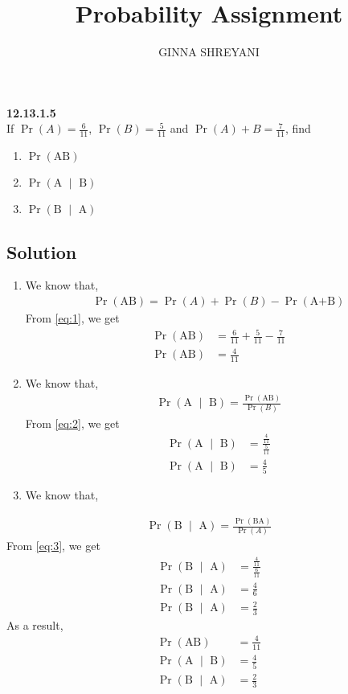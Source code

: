 \documentclass[10pt,twocolumn]{article}
\title{
Probability Assignment
}
\author{GINNA SHREYANI}
\date{}
\providecommand{\pr}[1]{\ensuremath{\Pr\left(#1\right)}}
\begin{document}
\maketitle


\textbf{12.13.1.5}\\
If $\pr A=\frac{6}{11}$, $\pr B=\frac{5}{11}$ and $\pr A+B=\frac{7}{11}$, find
\begin{enumerate}
	\item $\pr{\text{AB}}$   
	\item $\pr{\text{A $\mid$ B}}$
	\item $\pr{\text{B $\mid$ A}}$
\end{enumerate}
\subsection*{Solution}
\begin{enumerate}
	\item We know that,
\begin{align}
	\pr{\text{AB}} = \pr A + \pr B -\pr{\text{A+B}}
	\label{eq:1}
\end{align}
From \eqref{eq:1}, we get
\begin{align}
	\pr{\text{AB}} &= \frac{6}{11} + \frac{5}{11} - \frac{7}{11}\\
	\pr{\text{AB}} &= \frac{4}{11}
\end{align}
	\item We know that,
\begin{align}
	\pr{\text{A $\mid$ B}} = \frac{\pr{\text{AB}}}{\pr B}
	\label{eq:2}
\end{align}
From \eqref{eq:2}, we get
\begin{align}
	\pr{\text{A $\mid$ B}} &= \frac{\frac{4}{11}}{\frac{5}{11}}\\
	\pr{\text{A $\mid$ B}} &= \frac{4}{5}
\end{align}
	\item We know that,
\end{enumerate}
\begin{align}
	\pr{\text{B $\mid$ A}}=\frac{\pr{\text{BA}}}{\pr A}
	\label{eq:3}
\end{align}
From \eqref{eq:3}, we get
\begin{align}
	\pr{\text{B $\mid$ A}} &= \frac{\frac{4}{11}}{\frac{6}{11}}\\
	\pr{\text{B $\mid$ A}} &= \frac{4}{6}\\
	\pr{\text{B $\mid$ A}} &= \frac{2}{3}
\end{align}
As a result,
\begin{align}
	\pr{\text{AB}} &= \frac{4}{11}\\
	\pr{\text{A $\mid$ B}} &= \frac{4}{5}\\
	\pr{\text{B $\mid$ A}} &= \frac{2}{3}
\end{align}
\end{document}
